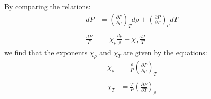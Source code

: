 \documentclass[main.tex]{subfiles}
\begin{document}
By comparing the relations:
\begin{align*}
    \label{apx:eq:differential_form_of_eos}
    dP &= \left( \frac{\partial P}{\partial \rho} \right)_T d\rho + \left( \frac{\partial P}{\partial T} \right)_\rho dT \\\\
    \frac{dP}{P} &= \chi_\rho \frac{d\rho}{\rho} + \chi_T \frac{dT}{T}
\end{align*}
we find that the exponents $\chi_\rho$ and $\chi_T$ are given by the equations:
\begin{align*}
    \chi_\rho &= \frac{\rho}{P} \left( \frac{\partial P}{\partial \rho} \right)_T \\\\
    \chi_T &= \frac{T}{P} \left( \frac{\partial P}{\partial T} \right)_\rho
\end{align*}
\end{document}
